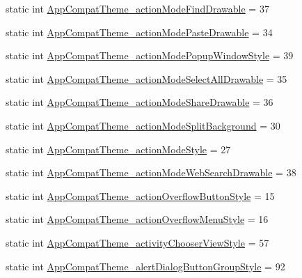 \begin{DoxyCompactItemize}
\item 
static int \hyperlink{classandroid_1_1support_1_1v7_1_1cardview_1_1R_1_1styleable_ae43827121aad1319f95c73c42ae1af0d}{App\+Compat\+Theme\+\_\+action\+Mode\+Find\+Drawable} = 37
\item 
static int \hyperlink{classandroid_1_1support_1_1v7_1_1cardview_1_1R_1_1styleable_a585391b394200065853c38c37575811d}{App\+Compat\+Theme\+\_\+action\+Mode\+Paste\+Drawable} = 34
\item 
static int \hyperlink{classandroid_1_1support_1_1v7_1_1cardview_1_1R_1_1styleable_aa231285ac74ab42e147ca4b9661753bf}{App\+Compat\+Theme\+\_\+action\+Mode\+Popup\+Window\+Style} = 39
\item 
static int \hyperlink{classandroid_1_1support_1_1v7_1_1cardview_1_1R_1_1styleable_ab0297c0ea60fe49a756d7ab2b43f0378}{App\+Compat\+Theme\+\_\+action\+Mode\+Select\+All\+Drawable} = 35
\item 
static int \hyperlink{classandroid_1_1support_1_1v7_1_1cardview_1_1R_1_1styleable_acdce974dcac87ee093ecef92f712b8dc}{App\+Compat\+Theme\+\_\+action\+Mode\+Share\+Drawable} = 36
\item 
static int \hyperlink{classandroid_1_1support_1_1v7_1_1cardview_1_1R_1_1styleable_a99300a8012a768bb28bea139da6de52e}{App\+Compat\+Theme\+\_\+action\+Mode\+Split\+Background} = 30
\item 
static int \hyperlink{classandroid_1_1support_1_1v7_1_1cardview_1_1R_1_1styleable_a50c09e1d32d726cfef89e5ad6164aac9}{App\+Compat\+Theme\+\_\+action\+Mode\+Style} = 27
\item 
static int \hyperlink{classandroid_1_1support_1_1v7_1_1cardview_1_1R_1_1styleable_abebfa202c2e142724eca48f1c73fdd66}{App\+Compat\+Theme\+\_\+action\+Mode\+Web\+Search\+Drawable} = 38
\item 
static int \hyperlink{classandroid_1_1support_1_1v7_1_1cardview_1_1R_1_1styleable_ab6fbca9d79a6ce0b5d32ae5bec46bb2f}{App\+Compat\+Theme\+\_\+action\+Overflow\+Button\+Style} = 15
\item 
static int \hyperlink{classandroid_1_1support_1_1v7_1_1cardview_1_1R_1_1styleable_af2526f4e27bf70cfd50bef8645b28ceb}{App\+Compat\+Theme\+\_\+action\+Overflow\+Menu\+Style} = 16
\item 
static int \hyperlink{classandroid_1_1support_1_1v7_1_1cardview_1_1R_1_1styleable_ab298049998a791e2af26b0dc51e76b10}{App\+Compat\+Theme\+\_\+activity\+Chooser\+View\+Style} = 57
\item 
static int \hyperlink{classandroid_1_1support_1_1v7_1_1cardview_1_1R_1_1styleable_ac3a18c29d8fce9bf5c1b142f1a07e531}{App\+Compat\+Theme\+\_\+alert\+Dialog\+Button\+Group\+Style} = 92

\end{DoxyCompactItemize}
